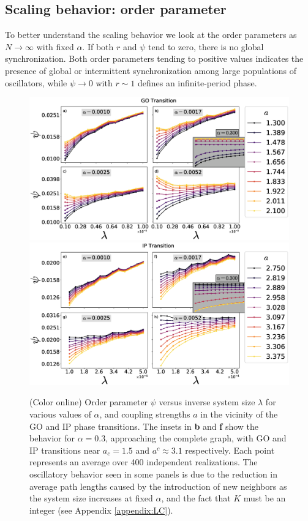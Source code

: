 \subsection{Scaling behavior: order parameter}

To better understand the scaling behavior we look at the order parameters as $N \to \infty$ with fixed $\alpha$. If both $r$ and $\psi$
tend to zero, there is no global synchronization. Both order parameters tending to positive values indicates the presence of global or
intermittent synchronization among large populations of oscillators, while $\psi \to 0$ with $r \sim 1$ defines an infinite-period
phase.

\begin{figure}
\begin{center}
    \includegraphics[width=0.85\linewidth]{fig/opsplit-psi-got.eps}
    \includegraphics[width=0.85\linewidth]{fig/opsplit-psi-ipt.eps}
\end{center}
\caption{\label{fig:opsplit} (Color online) Order parameter $\psi$ versus inverse system size $\lambda$ for various values of $\alpha$,
    and coupling strengths $a$ in the vicinity of the GO and IP phase transitions. The insets in \textbf{b} and \textbf{f} show the
    behavior for $\alpha=0.3$, approaching the complete graph, with GO and IP transitions near $a_c=1.5$ and $a^c\approx3.1$
    respectively.  Each point represents an average over 400 independent realizations.  The oscillatory behavior seen in some panels is
due to the reduction in average path lengths caused by the introduction of new neighbors as the system size increases at fixed
$\alpha$, and the fact that $K$ must be an integer (see Appendix \ref{appendix:LC}).}
\end{figure}

